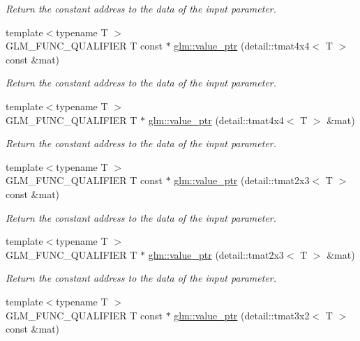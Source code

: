 \begin{DoxyCompactItemize}
\begin{DoxyCompactList}\small\item\em Return the constant address to the data of the input parameter. \end{DoxyCompactList}\item 
{\footnotesize template$<$typename T $>$ }\\G\-L\-M\-\_\-\-F\-U\-N\-C\-\_\-\-Q\-U\-A\-L\-I\-F\-I\-E\-R T const $\ast$ \hyperlink{group__gtc__type__ptr_ga1e7076c8387f3e7436a00453a1f5fe5e}{glm\-::value\-\_\-ptr} (detail\-::tmat4x4$<$ T $>$ const \&mat)
\begin{DoxyCompactList}\small\item\em Return the constant address to the data of the input parameter. \end{DoxyCompactList}\item 
{\footnotesize template$<$typename T $>$ }\\G\-L\-M\-\_\-\-F\-U\-N\-C\-\_\-\-Q\-U\-A\-L\-I\-F\-I\-E\-R T $\ast$ \hyperlink{group__gtc__type__ptr_gadc0d39ee1a6b84a4337840746649cca3}{glm\-::value\-\_\-ptr} (detail\-::tmat4x4$<$ T $>$ \&mat)
\begin{DoxyCompactList}\small\item\em Return the constant address to the data of the input parameter. \end{DoxyCompactList}\item 
{\footnotesize template$<$typename T $>$ }\\G\-L\-M\-\_\-\-F\-U\-N\-C\-\_\-\-Q\-U\-A\-L\-I\-F\-I\-E\-R T const $\ast$ \hyperlink{group__gtc__type__ptr_ga7a07a13118bdceeaef82e330f8f47fcf}{glm\-::value\-\_\-ptr} (detail\-::tmat2x3$<$ T $>$ const \&mat)
\begin{DoxyCompactList}\small\item\em Return the constant address to the data of the input parameter. \end{DoxyCompactList}\item 
{\footnotesize template$<$typename T $>$ }\\G\-L\-M\-\_\-\-F\-U\-N\-C\-\_\-\-Q\-U\-A\-L\-I\-F\-I\-E\-R T $\ast$ \hyperlink{group__gtc__type__ptr_gac99ce6d08fb5b645d543ea875567ea3b}{glm\-::value\-\_\-ptr} (detail\-::tmat2x3$<$ T $>$ \&mat)
\begin{DoxyCompactList}\small\item\em Return the constant address to the data of the input parameter. \end{DoxyCompactList}\item 
{\footnotesize template$<$typename T $>$ }\\G\-L\-M\-\_\-\-F\-U\-N\-C\-\_\-\-Q\-U\-A\-L\-I\-F\-I\-E\-R T const $\ast$ \hyperlink{group__gtc__type__ptr_gad58ae53d7a86bf7caadd7f1be2db3f1a}{glm\-::value\-\_\-ptr} (detail\-::tmat3x2$<$ T $>$ const \&mat)

\end{DoxyCompactItemize}
